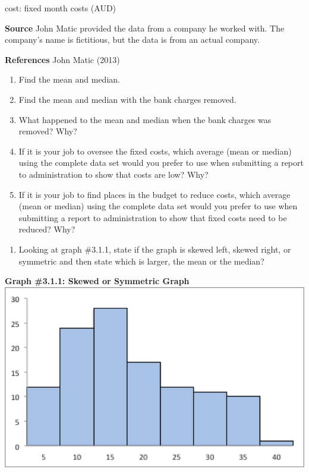 \documentclass[
]{book}
\providecommand{\tightlist}{%
  \setlength{\itemsep}{0pt}\setlength{\parskip}{0pt}}
\begin{document}
cost: fixed month costs (AUD)

\textbf{Source}
John Matic provided the data from a company he worked with. The company's name is fictitious, but the data is from an actual company.

\textbf{References}
John Matic (2013)

\begin{enumerate}
\def\labelenumi{\alph{enumi}.}
\item
  Find the mean and median.
\item
  Find the mean and median with the bank charges removed.
\item
  What happened to the mean and median when the bank charges was removed? Why?
\item
  If it is your job to oversee the fixed costs, which average (mean or median) using the complete data set would you prefer to use when submitting a report to administration to show that costs are low? Why?
\item
  If it is your job to find places in the budget to reduce costs, which average (mean or median) using the complete data set would you prefer to use when submitting a report to administration to show that fixed costs need to be reduced? Why?
\end{enumerate}

\begin{enumerate}
\def\labelenumi{\arabic{enumi}.}
\setcounter{enumi}{4}
\tightlist
\item
  Looking at graph \#3.1.1, state if the graph is skewed left, skewed right, or symmetric and then state which is larger, the mean or the median?
\end{enumerate}

\textbf{Graph \#3.1.1: Skewed or Symmetric Graph}
\includegraphics{graph_3_1_1.png}
\end{document}
